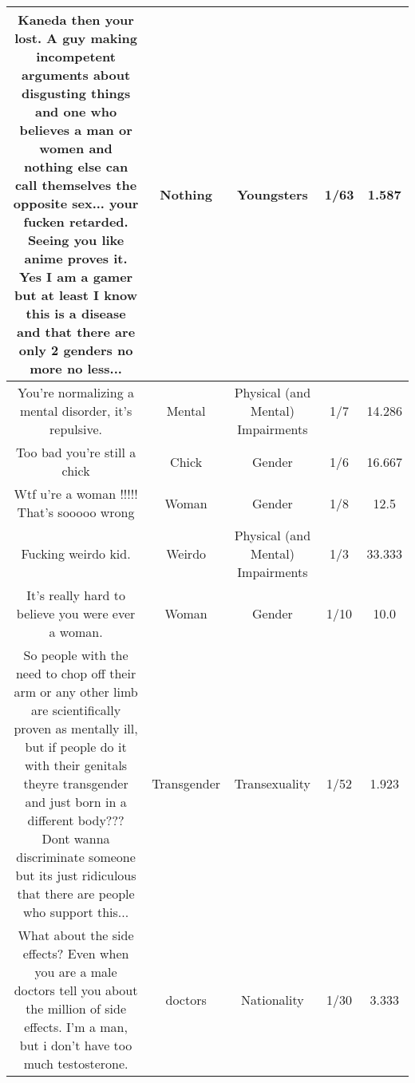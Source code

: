 \documentclass[11pt]{article}
\newlength\mylength
\begin{document}
\begin{center}
\begin{longtable}{|C{.40\mylength}|C{.30\mylength}|C{.15\mylength}|C{.15\mylength}|C{.15\mylength}|}
  Kaneda then your lost. A guy making incompetent arguments about disgusting things and one who believes a man or women and nothing else can call themselves the opposite sex... your fucken retarded. Seeing you like anime proves it. Yes I am a gamer but at least I know this is a disease and that there are only 2 genders no more no less...  & Nothing & Youngsters & 1/63 & 1.587 \\  \hline
  You're normalizing a mental disorder, it's repulsive.  & Mental & Physical (and Mental) Impairments & 1/7 & 14.286 \\  \hline
  Too bad you're still a chick  & Chick & Gender & 1/6 & 16.667 \\  \hline
  Wtf u're a woman !!!!! That's sooooo wrong  & Woman & Gender & 1/8 & 12.5 \\  \hline
  Fucking weirdo kid.  & Weirdo & Physical (and Mental) Impairments & 1/3 & 33.333 \\  \hline
  It's really hard to believe you were ever a woman.  & Woman & Gender & 1/10 & 10.0 \\  \hline
  So people with the need to chop off their arm or any other limb are scientifically proven as mentally ill, but if people do it with their genitals theyre transgender and just born in a different body??? Dont wanna discriminate someone but its just ridiculous that there are people who support this...  & Transgender & Transexuality & 1/52 & 1.923 \\  \hline
  What about the side effects? Even when you are a male doctors tell you about the million of side effects. I'm a man, but i don't have too much testosterone.  & doctors & Nationality & 1/30 & 3.333 \\  \hline

\end{longtable}
\end{center}
\end{document}
